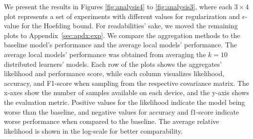 We present the results in Figures \ref{fig:analysis4} to \ref{fig:analysis3}, where each $3\times4$ plot represents a set of experiments with different values for regularization and $\epsilon$-value for the Hoefding bound. 
For readabilities' sake, we moved the remaining plots to Appendix~\ref{sec:apdx:exp}.
We compare the aggregation methods to the baseline model's performance and the average local models' performance. 
The average local models' performance was obtained from averaging the $k=10$ distributed learners' models.
Each row of the plots shows the aggregates' likelihood and performance score, while each column visualizes likelihood, accuracy, and F1-score when sampling from the respective covariance matrix.
The x-axes show the number of samples available on each device, and the y-axis shows the evaluation metric.
Positive values for the likelihood indicate the model being worse than the baseline, and negative values for accuracy and f1-score indicate worse performance when compared to the baseline.
The average relative likelihood is shown in the log-scale for better comparability.

